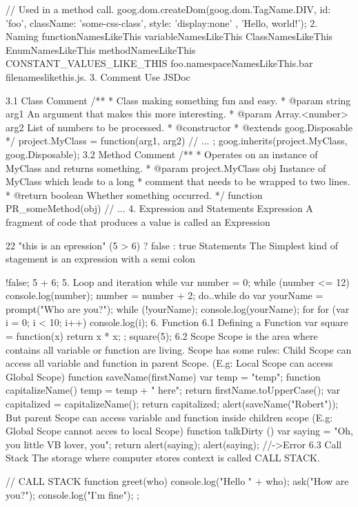 // Used in a method call.
goog.dom.createDom(goog.dom.TagName.DIV, {
  id: 'foo',
  className: 'some-css-class',
  style: 'display:none'
}, 'Hello, world!');
2. Naming
functionNamesLikeThis
variableNamesLikeThis
ClassNamesLikeThis
EnumNamesLikeThis
methodNamesLikeThis
CONSTANT_VALUES_LIKE_THIS
foo.namespaceNamesLikeThis.bar
filenameslikethis.js.
3. Comment
Use JSDoc

3.1 Class Comment
/**
 * Class making something fun and easy.
 * @param {string} arg1 An argument that makes this more interesting.
 * @param {Array.<number>} arg2 List of numbers to be processed.
 * @constructor
 * @extends {goog.Disposable}
 */
project.MyClass = function(arg1, arg2) {
  // ...
};
goog.inherits(project.MyClass, goog.Disposable);
3.2 Method Comment
/**
 * Operates on an instance of MyClass and returns something.
 * @param {project.MyClass} obj Instance of MyClass which leads to a long
 *     comment that needs to be wrapped to two lines.
 * @return {boolean} Whether something occurred.
 */
function PR_someMethod(obj) {
  // ...
}
4. Expression and Statements
Expression
A fragment of code that produces a value is called an Expression

22
"this is an epression"
(5 > 6) ? false : true
Statements
The Simplest kind of stagement is an expression with a semi colon

!false;
5 + 6;
5. Loop and iteration
while
var number = 0;
while (number <= 12) {
  console.log(number);
  number = number + 2;
}
do..while
do {
  var yourName = prompt("Who are you?");
} while (!yourName);
console.log(yourName);
for
for (var i = 0; i < 10; i++) {
  console.log(i);
}
6. Function
6.1 Defining a Function
var square = function(x) {
  return x * x;
};
square(5);
6.2 Scope
Scope is the area where contains all variable or function are living.
Scope has some rules:
Child Scope can access all variable and function in parent Scope. (E.g: Local Scope can access Global Scope)
function saveName(firstName) {
    var temp = "temp";
    function capitalizeName() {
        temp = temp + " here";
        return firstName.toUpperCase();
    }
    var capitalized = capitalizeName();
    return capitalized;
}
alert(saveName("Robert"));
But parent Scope can access variable and function inside children scope (E.g: Global Scope cannot acces to local Scope)
function talkDirty () {
    var saying = "Oh, you little VB lover, you";
    return alert(saying);
}
alert(saying); //->Error
6.3 Call Stack
The storage where computer stores context is called CALL STACK.

// CALL STACK
function greet(who) {
    console.log("Hello " + who);
    ask("How are you?");
    console.log("I'm fine");
};

